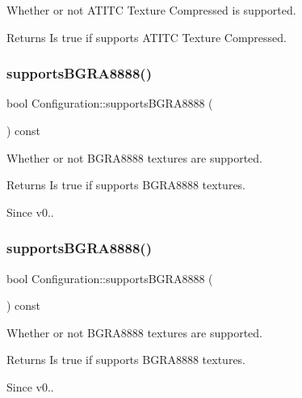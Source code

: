 Whether or not A\+T\+I\+TC Texture Compressed is supported.

\begin{DoxyReturn}{Returns}
Is true if supports A\+T\+I\+TC Texture Compressed. 
\end{DoxyReturn}
\mbox{\label{classConfiguration_a7a86b970a922722012ad50be92e1046f}} 
\subsubsection{\texorpdfstring{supports\+B\+G\+R\+A8888()}{supportsBGRA8888()}\hspace{0.1cm}{\footnotesize\ttfamily [1/2]}}
{\footnotesize\ttfamily bool Configuration\+::supports\+B\+G\+R\+A8888 (\begin{DoxyParamCaption}{ }\end{DoxyParamCaption}) const}

Whether or not B\+G\+R\+A8888 textures are supported.

\begin{DoxyReturn}{Returns}
Is true if supports B\+G\+R\+A8888 textures. 
\end{DoxyReturn}
\begin{DoxySince}{Since}
v0.. 
\end{DoxySince}
\mbox{\label{classConfiguration_a7a86b970a922722012ad50be92e1046f}} 
\subsubsection{\texorpdfstring{supports\+B\+G\+R\+A8888()}{supportsBGRA8888()}\hspace{0.1cm}{\footnotesize\ttfamily [2/2]}}
{\footnotesize\ttfamily bool Configuration\+::supports\+B\+G\+R\+A8888 (\begin{DoxyParamCaption}{ }\end{DoxyParamCaption}) const}

Whether or not B\+G\+R\+A8888 textures are supported.

\begin{DoxyReturn}{Returns}
Is true if supports B\+G\+R\+A8888 textures. 
\end{DoxyReturn}
\begin{DoxySince}{Since}
v0.. 
\end{DoxySince}
\mbox{\label{classConfiguration_aefcc23eeb53ca5d1fa1115f370c46fe9}} 

